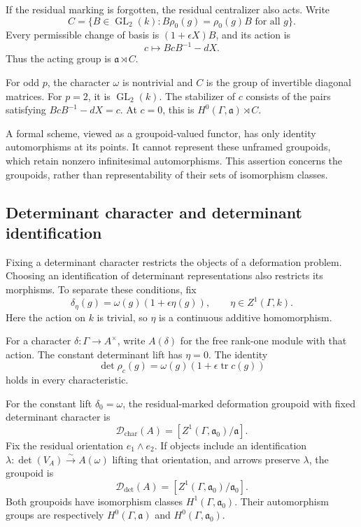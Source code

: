 If the residual marking is forgotten, the residual centralizer also acts.
Write
\[
 C=\{B\in\operatorname{GL}_2(k):B\rho_0(g)=\rho_0(g)B\text{ for all }g\}.
\]
Every permissible change of basis is \((1+\epsilon X)B\), and its action is
\[
 c\longmapsto BcB^{-1}-dX.
\]
Thus the acting group is \(\mathfrak a\rtimes C\).

For odd \(p\), the character \(\omega\) is nontrivial and \(C\) is the group of invertible diagonal matrices.
For \(p=2\), it is \(\operatorname{GL}_2(k)\).
The stabilizer of \(c\) consists of the pairs satisfying
\(BcB^{-1}-dX=c\). At \(c=0\), this is
\(H^0(\Gamma,\mathfrak a)\rtimes C\).

A formal scheme, viewed as a groupoid-valued functor, has only
identity automorphisms at its points. It cannot represent these
unframed groupoids, which retain nonzero infinitesimal automorphisms.
This assertion concerns the groupoids, rather than representability of
their sets of isomorphism classes.

\subsection{Determinant character and determinant identification}

Fixing a determinant character restricts the objects of a deformation
problem. Choosing an identification of determinant representations also
restricts its morphisms. To separate these conditions, fix
\[
 \delta_\eta(g)=\omega(g)(1+\epsilon\eta(g)),\qquad
 \eta\in Z^1(\Gamma,k).
\]
Here the action on \(k\) is trivial, so \(\eta\) is a continuous additive
homomorphism.

For a character \(\delta:\Gamma\to A^\times\), write \(A(\delta)\) for the free rank-one module with that action.
The constant determinant lift has \(\eta=0\).
The identity
\[
 \det\rho_c(g)=\omega(g)(1+\epsilon\operatorname{tr}c(g))
\]
holds in every characteristic.

\begin{proposition}
\label{v4-arith:ic:local-cyclotomic:determinant}
For the constant lift \(\delta_0=\omega\), the residual-marked deformation
groupoid with fixed determinant character is
\[
 \mathcal D_{\mathrm{char}}(A)
 =[Z^1(\Gamma,\mathfrak a_0)/\mathfrak a].
\]
Fix the residual orientation \(e_1\wedge e_2\).
If objects include an identification
\(\lambda:\det(V_A)\xrightarrow{\sim}A(\omega)\) lifting that orientation,
and arrows preserve \(\lambda\), the groupoid is
\[
 \mathcal D_{\mathrm{det}}(A)
 =[Z^1(\Gamma,\mathfrak a_0)/\mathfrak a_0].
\]
Both groupoids have isomorphism classes \(H^1(\Gamma,\mathfrak a_0)\).
Their automorphism groups are respectively \(H^0(\Gamma,\mathfrak a)\)
and \(H^0(\Gamma,\mathfrak a_0)\).
\end{proposition}


